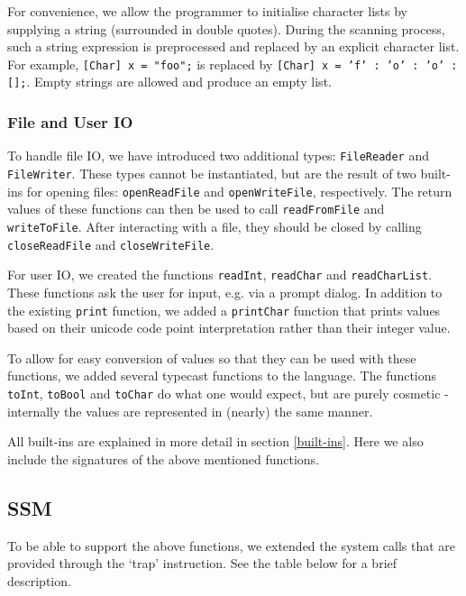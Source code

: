\documentclass[a4paper]{article}
\begin{document}
For convenience, we allow the programmer to initialise character lists by supplying a string (surrounded in double quotes). During the scanning process, such a string expression is preprocessed and replaced by an explicit character list. For example, {\tt [Char] x = "foo";} is replaced by {\tt [Char] x = 'f' : 'o' : 'o' : [];}. Empty strings are allowed and produce an empty list.

\subsubsection{File and User IO}

To handle file IO, we have introduced two additional types: \texttt{FileReader} and \texttt{FileWriter}. These types cannot be instantiated, but are the result of two built-ins for opening files: \texttt{openReadFile} and \texttt{openWriteFile}, respectively. The return values of these functions can then be used to call \texttt{readFromFile} and \texttt{writeToFile}. After interacting with a file, they should be closed by calling \texttt{closeReadFile} and \texttt{closeWriteFile}.

For user IO, we created the functions \texttt{readInt}, \texttt{readChar} and \texttt{readCharList}. These functions ask the user for input, e.g. via a prompt dialog. In addition to the existing \texttt{print} function, we added a \texttt{printChar} function that prints values based on their unicode code point interpretation rather than their integer value.

To allow for easy conversion of values so that they can be used with these functions, we added several typecast functions to the language. The functions \texttt{toInt}, \texttt{toBool} and \texttt{toChar} do what one would expect, but are purely cosmetic - internally the values are represented in (nearly) the same manner.

All built-ins are explained in more detail in section \ref{built-ins}. Here we also include the signatures of the above mentioned functions.

\subsection{SSM}

To be able to support the above functions, we extended the system calls that are provided through the `trap' instruction. See the table below for a brief description.
\end{document}
